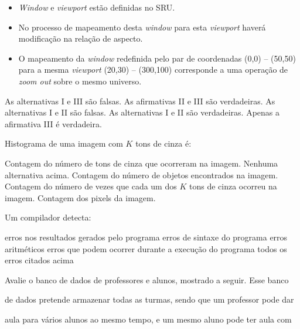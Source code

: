 \documentclass[12pt, addpoints]{exam}
\begin{document}
\begin{questions}
\begin{itemize}

    \item[I)] \textit{Window} e \textit{viewport} estão definidas no SRU.

    \item[II)] No processo de mapeamento desta \textit{window} para esta \textit{viewport} haverá modificação na relação de aspecto.

    \item[III)] O mapeamento da \textit{window} redefinida pelo par de coordenadas (0,0) – (50,50) para a mesma \textit{viewport} (20,30) – (300,100) corresponde a uma operação de \textit{zoom out} sobre o mesmo universo.

\end{itemize}
\begin{choices}
\choice As alternativas I e III são falsas.
\choice As afirmativas II e III são verdadeiras.
\choice As alternativas I e II são falsas.
\choice As alternativas I e II são verdadeiras.
\choice Apenas a afirmativa III é verdadeira.
\end{choices}

\question

Histograma de uma imagem com \( K \) tons de cinza é:
\begin{choices}
\choice Contagem do número de tons de cinza que ocorreram na imagem.
\choice Nenhuma alternativa acima.
\choice Contagem do número de objetos encontrados na imagem.
\choice Contagem do número de vezes que cada um dos \( K \) tons de cinza ocorreu na imagem.
\choice Contagem dos pixels da imagem.
\end{choices}

\question

Um compilador detecta:
\begin{choices}
\choice erros nos resultados gerados pelo programa
\choice erros de sintaxe do programa 
\choice erros aritméticos
\choice erros que podem ocorrer durante a execução do programa
\choice todos os erros citados acima
\end{choices}

\question

Avalie o banco de dados de professores e alunos, mostrado a seguir. Esse banco

de dados pretende armazenar todas as turmas, sendo que um professor pode dar

aula para vários alunos ao mesmo tempo, e um mesmo aluno pode ter aula com


\end{questions}
\end{document}
